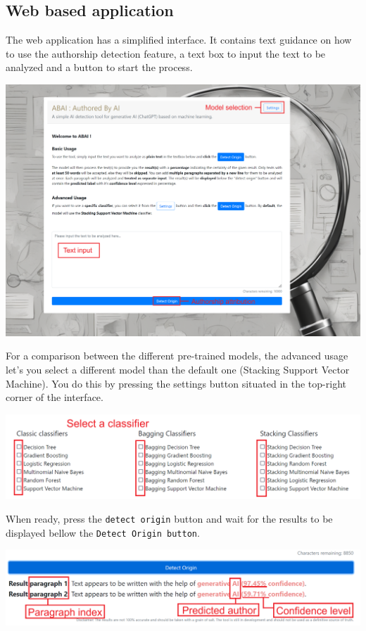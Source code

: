 \subsection{Web based application}
The web application has a simplified interface. It contains text guidance on how to use the authorship detection feature, a text box to input the text to be analyzed and a button to start the process.
\begin{center}
    \includegraphics[width=17cm]{Images/Usage/Web/Web-application.png}
\end{center}
For a comparison between the different pre-trained models, the advanced usage let's you select a different model than the default one (Stacking Support Vector Machine). You do this by pressing the settings button situated in the top-right corner of the interface.
\begin{center}
    \includegraphics[width=17cm]{Images/Usage/Web/Web-settings.png}
\end{center}
When ready, press the \texttt{detect origin} button and wait for the results to be displayed bellow the \texttt{Detect Origin button}.
\begin{center}
    \includegraphics[width=17cm]{Images/Usage/Web/Web-results.png}
\end{center}

